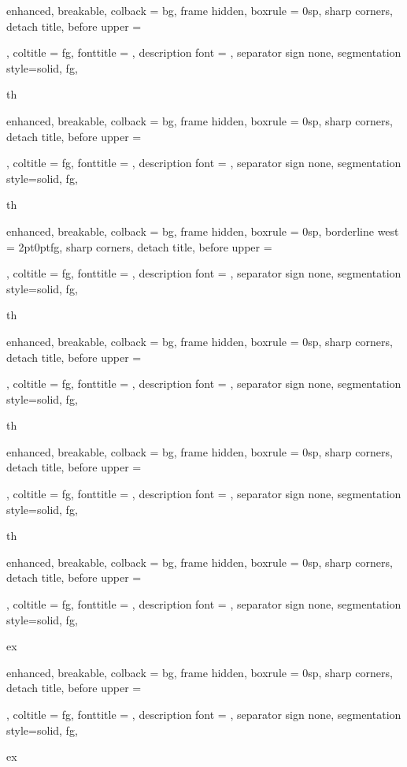 {%
	enhanced,
	breakable,
	colback = bg,
	frame hidden,
	boxrule = 0sp,
	sharp corners,
	detach title,
	before upper = \tcbtitle\par\smallskip,
	coltitle = fg,
	fonttitle = \sffamily,
	description font = \mdseries,
	separator sign none,
	segmentation style={solid, fg},
}
{th}
{%
	enhanced,
	breakable,
	colback = bg,
	frame hidden,
	boxrule = 0sp,
	sharp corners,
	detach title,
	before upper = \tcbtitle\par\smallskip,
	coltitle = fg,
	fonttitle = \sffamily,
	description font = \mdseries,
	separator sign none,
	segmentation style={solid, fg},
}
{th}


{%
	enhanced,
	breakable,
	colback = bg,
	frame hidden,
	boxrule = 0sp,
	borderline west = {2pt}{0pt}{fg},
	sharp corners,
	detach title,
	before upper = \tcbtitle\par\smallskip,
	coltitle = fg,
	fonttitle = \sffamily,
	description font = \mdseries,
	separator sign none,
	segmentation style={solid, fg},
}
{th}

{%
	enhanced,
	breakable,
	colback = bg,
	frame hidden,
	boxrule = 0sp,
	sharp corners,
	detach title,
	before upper = \tcbtitle\par\smallskip,
	coltitle = fg,
	fonttitle = \sffamily,
	description font = \mdseries,
	separator sign none,
	segmentation style={solid, fg},
}
{th}
{%
	enhanced,
	breakable,
	colback = bg,
	frame hidden,
	boxrule = 0sp,
	sharp corners,
	detach title,
	before upper = \tcbtitle\par\smallskip,
	coltitle = fg,
	fonttitle = \sffamily,
	description font = \mdseries,
	separator sign none,
	segmentation style={solid, fg},
}
{th}


{%
	enhanced,
	breakable,
	colback = bg,
	frame hidden,
	boxrule = 0sp,
	sharp corners,
	detach title,
	before upper = \tcbtitle\par\smallskip,
	coltitle = fg,
	fonttitle = \sffamily,
	description font = \mdseries,
	separator sign none,
	segmentation style={solid, fg},
}
{ex}
{%
	enhanced,
	breakable,
	colback = bg,
	frame hidden,
	boxrule = 0sp,
	sharp corners,
	detach title,
	before upper = \tcbtitle\par\smallskip,
	coltitle = fg,
	fonttitle = \sffamily,
	description font = \mdseries,
	separator sign none,
	segmentation style={solid, fg},
}
{ex}


